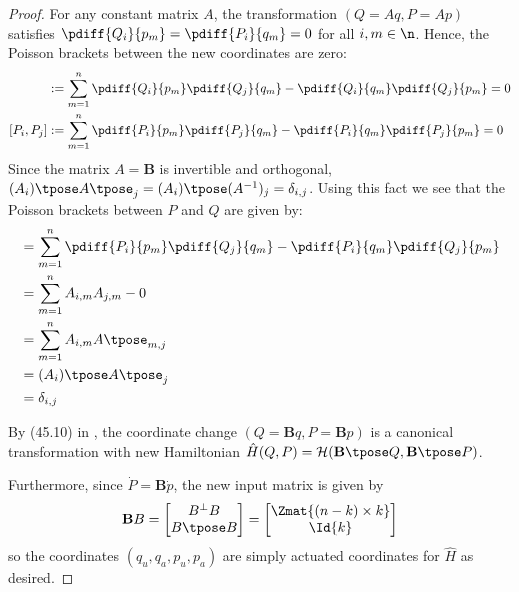 \begin{proof}
    For any constant matrix \(A\), the transformation
    \((Q = Aq, P = Ap)\) satisfies
    \(\pdiff{Q_i}{p_m} = \pdiff{P_i}{q_m} = 0\) for all 
    \(i,m \in \n\). Hence, the Poisson brackets between the
    new coordinates are zero:
    \begin{align*}
        [Q_i,Q_j] &:= \sum\limits_{m = 1}^n \pdiff{Q_i}{p_m}\pdiff{Q_j}{q_m} - 
        \pdiff{Q_i}{q_m}\pdiff{Q_j}{p_m} = 0 \\
        [P_i,P_j] &:= \sum\limits_{m=1}^n \pdiff{P_i}{p_m}\pdiff{P_j}{q_m} -
        \pdiff{P_i}{q_m}\pdiff{P_j}{p_m} = 0
    \end{align*}
    Since the matrix \(A = \mathbf{B}\) is invertible and orthogonal,
    \((A_i)\tpose A\tpose_j = (A_i)\tpose (A^{-1})_j = \delta_{i,j}\). Using this
    fact we see that the Poisson brackets between \(P\) and \(Q\) are given by:
    \begin{align*}
        [P_i,Q_j] &= \sum\limits_{m=1}^n\pdiff{P_i}{p_m}\pdiff{Q_j}{q_m}
        - \pdiff{P_i}{q_m}\pdiff{Q_j}{p_m} \\
                  &= \sum\limits_{m=1}^n A_{i,m}A_{j,m} - 0 \\
                  &= \sum\limits_{m=1}^n A_{i,m}A\tpose_{m,j} \\
                  &= (A_i)\tpose A\tpose_j \\
                  &= \delta_{i,j}
    \end{align*}

    By (45.10) in \cite{landau_mechanics}, the coordinate change
    \((Q = \mathbf{B}q, P = \mathbf{B}p)\) is a canonical transformation with
    new Hamiltonian 
    \(\hat{H}(Q,P) = \mathcal{H}(\mathbf{B}\tpose Q,\mathbf{B}\tpose P)\).

    Furthermore, since \(\dot{P} = \mathbf{B}\dot{p}\), the new input matrix is
    given by 
    \[
        \mathbf{B}B = \begin{bmatrix}
            B^\perp B \\
            B\tpose B \\
        \end{bmatrix} = 
        \begin{bmatrix}
            \Zmat{(n-k)\times k} \\
            \Id{k}
        \end{bmatrix}
    \]
    so the coordinates \((q_u,q_a,p_u,p_a)\) are simply actuated coordinates for 
    \(\hat{H}\) as desired.
\end{proof}

